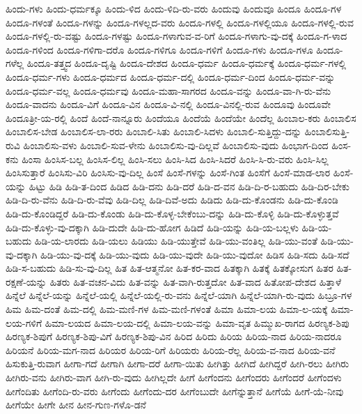 {ಹಿಂದು-ಗಳು
ಹಿಂದು-ಧರ್ಮಕ್ಕೂ
ಹಿಂದು-ಳಿದ
ಹಿಂದು-ಳಿದಿ-ರು-ವರು
ಹಿಂದುವು
ಹಿಂದುವೂ
ಹಿಂದೂ
ಹಿಂದೂ-ಗಳ
ಹಿಂದೂ-ಗಳಂತೆ
ಹಿಂದೂ-ಗಳನ್ನು
ಹಿಂದೂ-ಗಳಲ್ಲದ-ವರು
ಹಿಂದೂ-ಗಳಲ್ಲಿ
ಹಿಂದೂ-ಗಳಲ್ಲಿಯೂ
ಹಿಂದೂ-ಗಳಲ್ಲಿ-ರುವ
ಹಿಂದೂ-ಗಳಲ್ಲಿ-ರು-ವಷ್ಟು
ಹಿಂದೂ-ಗಳಷ್ಟು
ಹಿಂದೂ-ಗಳಾಗುವ-ವ-ರಿಗೆ
ಹಿಂದೂ-ಗಳಾಗು-ವು-ದಕ್ಕೆ
ಹಿಂದೂ-ಗ-ಳಾದ
ಹಿಂದೂ-ಗಳಿಂದ
ಹಿಂದೂ-ಗಳಿಗಾ-ದರೊ
ಹಿಂದೂ-ಗಳಿಗೂ
ಹಿಂದೂ-ಗಳಿಗೆ
ಹಿಂದೂ-ಗಳು
ಹಿಂದೂ-ಗಳೂ
ಹಿಂದೂ-ಗಳೆಲ್ಲ
ಹಿಂದೂ-ತತ್ತ್ವದ
ಹಿಂದೂ-ದೃಷ್ಟಿ
ಹಿಂದೂ-ದೇಶದ
ಹಿಂದೂ-ಧರ್ಮ
ಹಿಂದೂ-ಧರ್ಮಕ್ಕೆ
ಹಿಂದೂ-ಧರ್ಮ-ಗಳಲ್ಲಿ
ಹಿಂದೂ-ಧರ್ಮ-ಗಳು
ಹಿಂದೂ-ಧರ್ಮದ
ಹಿಂದೂ-ಧರ್ಮ-ದಲ್ಲಿ
ಹಿಂದೂ-ಧರ್ಮ-ದಿಂದ
ಹಿಂದೂ-ಧರ್ಮ-ವನ್ನು
ಹಿಂದೂ-ಧರ್ಮ-ವಲ್ಲ
ಹಿಂದೂ-ಧರ್ಮವು
ಹಿಂದೂ-ಮಹಾ-ಸಾಗರದ
ಹಿಂದೂ-ವನ್ನು
ಹಿಂದೂ-ವಾ-ಗಿ-ರು-ವೆನು
ಹಿಂದೂ-ವಾದನು
ಹಿಂದೂ-ವಿಗೆ
ಹಿಂದೂ-ವಿನ
ಹಿಂದೂ-ವಿ-ನಲ್ಲಿ
ಹಿಂದೂ-ವಿನಲ್ಲಿ-ರುವ
ಹಿಂದೂವು
ಹಿಂದೂವೇ
ಹಿಂದೂತ್ರೀ-ಯ-ರಲ್ಲಿ
ಹಿಂದೆ
ಹಿಂದೆ-ನಾನ್ನೂರು
ಹಿಂದೆಯೂ
ಹಿಂದೆಯೆ
ಹಿಂದೆಯೇ
ಹಿಂದೆಲ್ಲ
ಹಿಂಬಾಲ-ಕರು
ಹಿಂಬಾಲಿಸ
ಹಿಂಬಾಲಿಸ-ಬೇಡ
ಹಿಂಬಾಲಿಸ-ಲಾ-ರರು
ಹಿಂಬಾಲಿ-ಸಿತು
ಹಿಂಬಾಲಿ-ಸಿದಳು
ಹಿಂಬಾಲಿ-ಸುತ್ತಿದ್ದು-ದನ್ನು
ಹಿಂಬಾಲಿಸುತ್ತಿ-ರುವಿ
ಹಿಂಬಾಲಿಸು-ವಳು
ಹಿಂಬಾಲಿ-ಸುವ-ಳೇನು
ಹಿಂಬಾಲಿಸು-ವು-ದಿಲ್ಲವೆ
ಹಿಂಬಾಲಿಸು-ವುದು
ಹಿಂಭಾಗ-ದಿಂದ
ಹಿಂಸ-ಕನು
ಹಿಂಸಾ
ಹಿಂಸಿಸ-ಬಲ್ಲ
ಹಿಂಸಿಸ-ಲಿಲ್ಲ
ಹಿಂಸಿ-ಸಲು
ಹಿಂಸಿ-ಸಿದ
ಹಿಂಸಿ-ಸಿದರೆ
ಹಿಂಸಿ-ಸಿ-ರು-ವರು
ಹಿಂಸಿ-ಸಿಲ್ಲ
ಹಿಂಸಿಸುತ್ತಾರೆ
ಹಿಂಸಿಸು-ವಿರಿ
ಹಿಂಸಿಸು-ವು-ದಿಲ್ಲ
ಹಿಂಸೆ
ಹಿಂಸೆ-ಗಳನ್ನು
ಹಿಂಸೆ-ಗಿಂತ
ಹಿಂಸೆಗೆ
ಹಿಂಸೆ-ಮಾಡ-ಲಾರ
ಹಿಂಸೆ-ಯನ್ನು
ಹಿಟ್ಟು
ಹಿಡಿ
ಹಿಡಿ-ತ-ದಿಂದ
ಹಿಡಿದ
ಹಿಡಿ-ದನು
ಹಿಡಿ-ದರೆ
ಹಿಡಿ-ದ-ವನ
ಹಿಡಿ-ದಿ-ರ-ಬಹುದು
ಹಿಡಿ-ದಿರ-ಬೇಕು
ಹಿಡಿ-ದಿ-ರು-ವೆನು
ಹಿಡಿ-ದಿ-ರು-ವೆವು
ಹಿಡಿ-ದಿಲ್ಲ
ಹಿಡಿ-ದಿವೆ-ಅದು
ಹಿಡಿದು
ಹಿಡಿ-ದು-ಕೊಂಡನು
ಹಿಡಿ-ದು-ಕೊಂಡಿ
ಹಿಡಿ-ದು-ಕೊಂಡಿದ್ದರೆ
ಹಿಡಿ-ದು-ಕೊಂಡು
ಹಿಡಿ-ದು-ಕೊಳ್ಳ-ಬೇಕೆಂಬು-ದನ್ನು
ಹಿಡಿ-ದು-ಕೊಳ್ಳಿ
ಹಿಡಿ-ದು-ಕೊಳ್ಳುತ್ತವೆ
ಹಿಡಿ-ದು-ಕೊಳ್ಳು-ವು-ದಕ್ಕಾಗಿ
ಹಿಡಿ-ದುದೇ
ಹಿಡಿ-ದು-ಹೋಗ
ಹಿಡಿದೆ
ಹಿಡಿ-ಯನ್ನು
ಹಿಡಿ-ಯ-ಬಲ್ಲಳು
ಹಿಡಿ-ಯ-ಬಹುದು
ಹಿಡಿ-ಯ-ಲಾರದು
ಹಿಡಿ-ಯಲು
ಹಿಡಿಯು
ಹಿಡಿ-ಯುತ್ತೇವೆ
ಹಿಡಿ-ಯು-ವಂತಿಲ್ಲ
ಹಿಡಿ-ಯು-ವಂತೆ
ಹಿಡಿ-ಯು-ವು-ದಕ್ಕಾಗಿ
ಹಿಡಿ-ಯು-ವು-ದಕ್ಕೆ
ಹಿಡಿ-ಯು-ವುದು
ಹಿಡಿ-ಯು-ವುದೇ
ಹಿಡಿ-ಯು-ವುದೋ
ಹಿಡಿಸ
ಹಿಡಿ-ಸದು
ಹಿಡಿ-ಸದೆ
ಹಿಡಿ-ಸ-ಬಹುದು
ಹಿಡಿ-ಸು-ವು-ದಿಲ್ಲ
ಹಿತ
ಹಿತ-ಆತ್ಮನೋ
ಹಿತ-ಕರ-ವಾದ
ಹಿತಕ್ಕಾಗಿ
ಹಿತಕ್ಕೆ
ಹಿತಕ್ಕೋಸುಗ
ಹಿತರ
ಹಿತ-ರಕ್ಷಣೆ-ಯನ್ನು
ಹಿತರು
ಹಿತ-ವಚನ-ವಿದು
ಹಿತ-ವನ್ನು
ಹಿತ-ವಾಗಿ-ರುತ್ತದೋ
ಹಿತ-ವಾದ
ಹಿತೋಪ-ದೇಶದ
ಹಿತ್ತಾಳೆ
ಹಿನ್ನೆಲೆ
ಹಿನ್ನೆಲೆ-ಯನ್ನು
ಹಿನ್ನೆಲೆ-ಯಲ್ಲಿ
ಹಿನ್ನೆಲೆ-ಯಲ್ಲಿ-ರು-ವನು
ಹಿನ್ನೆಲೆ-ಯಾಗಿ
ಹಿನ್ನೆಲೆ-ಯಾಗಿ-ರು-ವುದು
ಹಿಬ್ರೂ-ಗಳ
ಹಿಮ
ಹಿಮ-ದಂತೆ
ಹಿಮ-ದಲ್ಲಿ
ಹಿಮ-ಮಣಿ-ಗಳ
ಹಿಮ-ಮಣಿ-ಗಳಂತೆ
ಹಿಮಾ
ಹಿಮಾ-ಲಯ
ಹಿಮಾ-ಲ-ಯಕ್ಕೆ
ಹಿಮಾ-ಲಯ-ಗಳಿಗೆ
ಹಿಮಾ-ಲಯದ
ಹಿಮಾ-ಲಯ-ದಲ್ಲಿ
ಹಿಮಾ-ಲಯ-ವನ್ನು
ಹಿಮಾ-ವೃತ
ಹಿಮ್ಮುಖ-ರಾಗದ
ಹಿರಣ್ಯಕ-ಶಿಪು
ಹಿರಣ್ಯಕ-ಶಿಪುಗೆ
ಹಿರಣ್ಯಕ-ಶಿಪು-ವಿಗೆ
ಹಿರಣ್ಯಕ-ಶಿಪು-ವಿನ
ಹಿರಿದ
ಹಿರಿದು
ಹಿರಿಯ
ಹಿರಿಯ-ನಾದ
ಹಿರಿಯ-ನಾದರೂ
ಹಿರಿಯನೆ
ಹಿರಿಯ-ಮಗ-ನಾದ
ಹಿರಿಯರ
ಹಿರಿಯ-ರಿಗೆ
ಹಿರಿಯರು
ಹಿರಿಯ-ರೆಲ್ಲ
ಹಿರಿಯ-ವ-ನಾದ
ಹಿರಿಯ-ವನೆ
ಹಿಸುಕುತ್ತಿ-ರುವಾಗ
ಹೀಗಾ-ಗದೆ
ಹೀಗಾಗಿ
ಹೀಗಾ-ದರೆ
ಹೀಗಾ-ಯಿತು
ಹೀಗಿತ್ತು
ಹೀಗಿದೆ
ಹೀಗಿದ್ದರೆ
ಹೀಗಿ-ರಲು
ಹೀಗಿರು
ಹೀಗಿರು-ವನು
ಹೀಗಿರು-ವಾಗ
ಹೀಗಿ-ರು-ವುದು
ಹೀಗಿಲ್ಲದೇ
ಹೀಗೆ
ಹೀಗೆಂದನು
ಹೀಗೆಂದರು
ಹೀಗೆಂದರೆ
ಹೀಗೆಂದಳು
ಹೀಗೆಂದಿತು
ಹೀಗೆಂದಿ-ರು-ವರು
ಹೀಗೆಂದು
ಹೀಗೆಂದು-ದರ
ಹೀಗೆಂಬುದೇ
ಹೀಗೆನ್ನುತ್ತಾನೆ
ಹೀಗೆಯೆ
ಹೀಗೆ-ಯೆ-ನೀವು
ಹೀಗೆಯೇ
ಹೀಗೇ
ಹೀನ
ಹೀನ-ಗುಣ-ಗಳೊ-ಡನೆ
}
